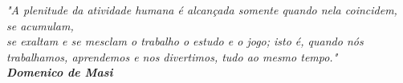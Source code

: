 \begin{epigrafe}[]
    \vspace*{\fill}
	\begin{flushright}
	
		\textit{"A plenitude da atividade humana é alcançada somente quando nela coincidem, se acumulam,\\ se exaltam e se mesclam o trabalho o estudo e o jogo; isto é,  quando nós \\ trabalhamos, aprendemos e nos divertimos, tudo ao mesmo tempo."\\
				\textbf{Domenico de Masi}}
		
	\end{flushright}
\end{epigrafe}
